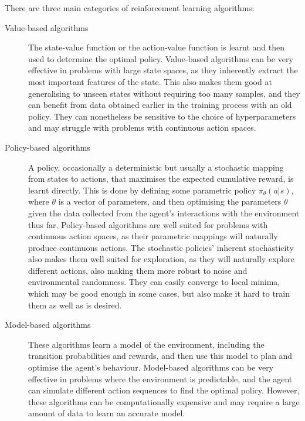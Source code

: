 There are three main categories of reinforcement learning algorithms:
\begin{description}
    \item[Value-based algorithms]
        The state-value function or the action-value function is learnt and then used to determine the optimal policy.
        Value-based algorithms can be very effective in problems with large state spaces, as they inherently extract the most important features of the state.
        This also makes them good at generalising to unseen states without requiring too many samples, and they can benefit from data obtained earlier in the training process with an old policy.
        They can nonetheless be sensitive to the choice of hyperparameters and may struggle with problems with continuous action spaces.


    \item[Policy-based algorithms]
        A policy, occasionally a deterministic but usually a stochastic mapping from states to actions, that maximises the expected cumulative reward, is learnt directly.
        This is done by defining some parametric policy $\pi_\theta(a | s)$, where $\theta$ is a vector of parameters, and then optimising the parameters $\theta$ given the data collected from the agent's interactions with the environment thus far.
        Policy-based algorithms are well suited for problems with continuous action spaces, as their parametric mappings will naturally produce continuous actions.
        The stochastic policies' inherent stochasticity also makes them well suited for exploration, as they will naturally explore different actions, also making them more robust to noise and environmental randomness.
        They can easily converge to local minima, which may be good enough in some cases, but also make it hard to train them as well as is desired.

    \item[Model-based algorithms]
        These algorithms learn a model of the environment, including the transition probabilities and rewards, and then use this model to plan and optimise the agent's behaviour.
        Model-based algorithms can be very effective in problems where the environment is predictable, and the agent can simulate different action sequences to find the optimal policy.
        However, these algorithms can be computationally expensive and may require a large amount of data to learn an accurate model.

\end{description}

